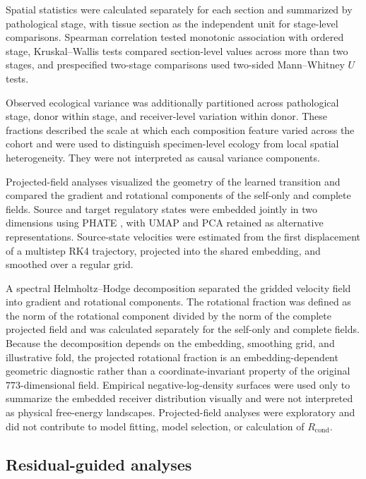Spatial statistics were calculated separately for each section and summarized
by pathological stage, with tissue section as the independent unit for
stage-level comparisons. Spearman correlation tested monotonic association with
ordered stage, Kruskal--Wallis tests compared section-level values across more
than two stages, and prespecified two-stage comparisons used two-sided
Mann--Whitney \(U\) tests.

Observed ecological variance was additionally partitioned across pathological
stage, donor within stage, and receiver-level variation within donor. These
fractions described the scale at which each composition feature varied across
the cohort and were used to distinguish specimen-level ecology from local
spatial heterogeneity. They were not interpreted as causal variance
components.

Projected-field analyses visualized the geometry of the learned transition and
compared the gradient and rotational components of the self-only and complete
fields. Source and target regulatory states were embedded jointly in two
dimensions using PHATE \autocite{Moon2019-cb}, with UMAP
\autocite{McInnes2018-fb} and PCA retained as alternative representations.
Source-state velocities were estimated from the first displacement of a
multistep RK4 trajectory, projected into the shared embedding, and smoothed over
a regular grid.

A spectral Helmholtz--Hodge decomposition separated the gridded velocity field
into gradient and rotational components. The rotational fraction was defined
as the norm of the rotational component divided by the norm of the complete
projected field and was calculated separately for the self-only and complete
fields. Because the decomposition depends on the embedding, smoothing grid, and
illustrative fold, the projected rotational fraction is an
embedding-dependent geometric diagnostic rather than a coordinate-invariant
property of the original \(773\)-dimensional field. Empirical
negative-log-density surfaces were used only to summarize the embedded receiver
distribution visually and were not interpreted as physical free-energy
landscapes. Projected-field analyses were exploratory and did not contribute to
model fitting, model selection, or calculation of \(R_{\mathrm{cond}}\).

\subsection{Residual-guided analyses}
\label{sec:methods-grn}
\label{sec:methods-communication}

